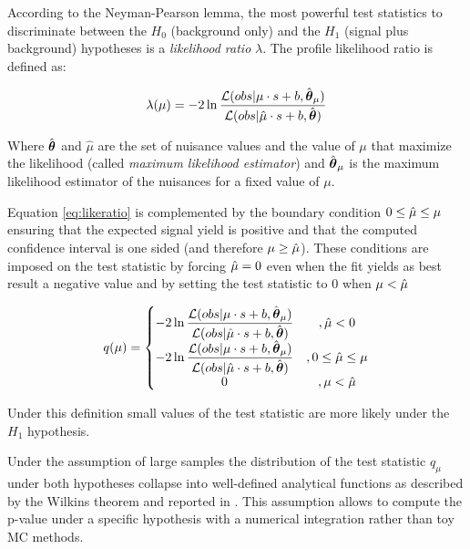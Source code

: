 
According to the Neyman-Pearson lemma, the most powerful test statistics to discriminate between the $H_0$ (background only) and the $H_1$ (signal plus background) hypotheses is a \emph{likelihood ratio} $\lambda$. The profile likelihood ratio is defined as:

\begin{equation}
\label{eq:likeratio}
\lambda(\mu) = -2 \operatorname{ln} \dfrac{\mathcal{L}(obs | \mu \cdot s + b, \hat{\boldsymbol\theta}_\mu)}{\mathcal{L}(obs | \hat{\mu} \cdot s + b, \hat{\boldsymbol\theta})}
\end{equation}

Where $\hat{\boldsymbol\theta}$ and $\hat{\mu}$ are the set of nuisance values and the value of $\mu$ that maximize the likelihood (called \emph{maximum likelihood estimator}) and $\hat{\boldsymbol\theta}_\mu$ is the maximum likelihood estimator of the nuisances for a fixed value of $\mu$.

Equation \ref{eq:likeratio} is complemented by the boundary condition $0 \leq \hat{\mu} \leq \mu$ ensuring that the expected signal yield is positive and that the computed confidence interval is one sided (and therefore $\mu \geq \hat{\mu}$). These conditions are imposed on the test statistic by forcing $\hat{\mu} = 0$ even when the fit yields as best result a negative value and by setting the test statistic to 0 when $\mu < \hat{\mu}$

\begin{equation}
q(\mu) = \left\{\begin{matrix}
-2 \operatorname{ln} \dfrac{\mathcal{L}(obs | \mu \cdot s + b, \hat{\boldsymbol\theta}_\mu)}{\mathcal{L}(obs | \hat{\mu} \cdot s + b, \hat{\boldsymbol\theta})} & , \hat{\mu} < 0\\ 
-2 \operatorname{ln} \dfrac{\mathcal{L}(obs | \mu \cdot s + b, \hat{\boldsymbol\theta}_\mu)}{\mathcal{L}(obs | \hat{\mu} \cdot s + b, \hat{\boldsymbol\theta})} & ,0 \leq \hat{\mu} \leq \mu \\ 
0 & , \mu < \hat{\mu}
\end{matrix}\right.
\end{equation}

Under this definition small values of the test statistic are more likely under the $H_1$ hypothesis.

Under the assumption of large samples the distribution of the test statistic $q_\mu$ under both hypotheses collapse into well-defined analytical functions as described by the Wilkins theorem and reported in \cite{Cowan:2010js, higgscombo}. This assumption allows to compute the p-value under a specific hypothesis with a numerical integration rather than toy MC methods.

